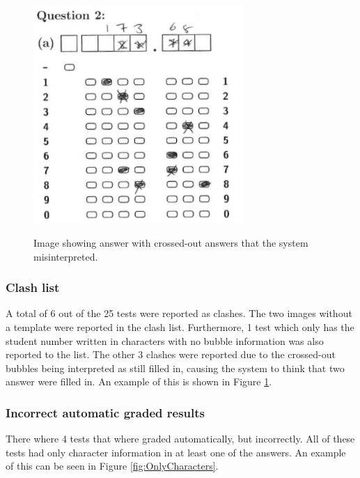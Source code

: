 \begin{figure}
  \centering
  \includegraphics[width=8cm]{crossClash}\\
  \caption{Image showing answer with crossed-out answers that the system misinterpreted.}
  \label{fig:crossClash}
\end{figure}

\subsubsection{Clash list}

A total of 6 out of the 25 tests were reported as clashes. The two images without a template were reported in the clash list. Furthermore, 1 test which only has the student number written in characters with no bubble information was also reported to the list. The other 3 clashes were reported due to the crossed-out bubbles being interpreted as still filled in, causing the system to think that two answer were filled in. An example of this is shown in Figure \ref{fig:crossClash}.

\subsubsection{Incorrect automatic graded results}

There where 4 tests that where graded automatically, but incorrectly. All of these tests had only character information in at least one of the answers. An example of this can be seen in Figure \ref{fig:OnlyCharacters}.

